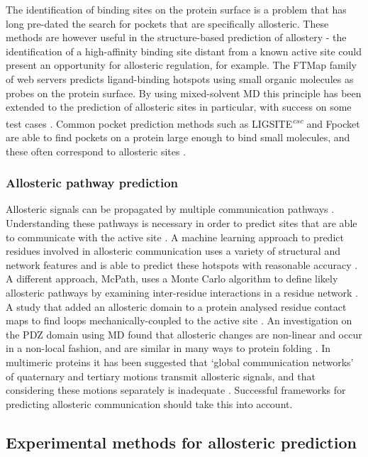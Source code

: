 The identification of binding sites on the protein surface is a problem that has long pre-dated the search for pockets that are specifically allosteric.
These methods are however useful in the structure-based prediction of allostery - the identification of a high-affinity binding site distant from a known active site could present an opportunity for allosteric regulation, for example.
The FTMap family of web servers \cite{Kozakov2015} predicts ligand-binding hotspots using small organic molecules as probes on the protein surface.
By using mixed-solvent MD this principle has been extended to the prediction of allosteric sites in particular, with success on some test cases \cite{Ghanakota2016}.
Common pocket prediction methods such as LIGSITE\textsuperscript{\it csc} \cite{Huang2006} and Fpocket \cite{LeGuilloux2009} are able to find pockets on a protein large enough to bind small molecules, and these often correspond to allosteric sites \cite{Huang2013}.


\subsubsection{Allosteric pathway prediction}

Allosteric signals can be propagated by multiple communication pathways \cite{DelSol2009}.
Understanding these pathways is necessary in order to predict sites that are able to communicate with the active site \cite{Dokholyan2016}.
A machine learning approach to predict residues involved in allosteric communication uses a variety of structural and network features and is able to predict these hotspots with reasonable accuracy \cite{Demerdash2009}.
A different approach, McPath, uses a Monte Carlo algorithm to define likely allosteric pathways by examining inter-residue interactions in a residue network \cite{Kaya2013}.
A study that added an allosteric domain to a protein analysed residue contact maps to find loops mechanically-coupled to the active site \cite{Dagliyan2016}.
An investigation on the PDZ domain using MD found that allosteric changes are non-linear and occur in a non-local fashion, and are similar in many ways to protein folding \cite{Buchenberg2017}.
In multimeric proteins it has been suggested that `global communication networks' of quaternary and tertiary motions transmit allosteric signals, and that considering these motions separately is inadequate \cite{Daily2009}.
Successful frameworks for predicting allosteric communication should take this into account.


\subsection{Experimental methods for allosteric prediction}

